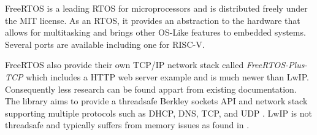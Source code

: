 FreeRTOS is a leading RTOS for microprocessors and is distributed freely under the MIT license. As an RTOS, it provides an abstraction to the hardware that allows 
for multitasking and brings other OS-Like features to embedded systems. Several ports are available including one for RISC-V. 

FreeRTOS also provide their own TCP/IP network stack called \textit{FreeRTOS-Plus-TCP} which includes a HTTP web server example and is much newer than LwIP.
Consequently less research can be found appart from existing documentation. The library aims to provide a threadsafe Berkley sockets API and network stack 
supporting multiple protocols such as DHCP, DNS, TCP, and UDP \cite{FreeRTOSTCP}. LwIP is not threadsafe and typically suffers from memory issues as found 
in \cite{OptimCortexLwIP}.


